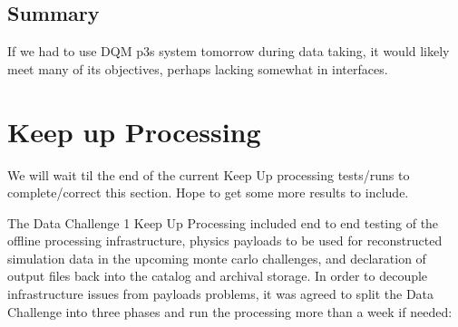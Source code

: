 \documentclass[pdftex,12pt,letter]{article}
\begin{document}
\subsection{Summary}
If we had to use DQM p3s system tomorrow during data taking, it would likely meet many of its objectives, perhaps lacking somewhat in interfaces.
 
 

\section {Keep up Processing}

 \color{red} We will wait til the end of the current Keep Up processing tests/runs to complete/correct this section. Hope to get some more results to include.
 \color{black}

The Data Challenge 1 Keep Up Processing  included end to end testing of the offline processing infrastructure, physics payloads to be used for reconstructed simulation data in the upcoming monte carlo challenges, and declaration of output files back into the catalog and archival storage.  In order to decouple infrastructure issues from  payloads problems, it was agreed to split the Data Challenge into three phases and run the processing more than a week if needed:
\end{document}
